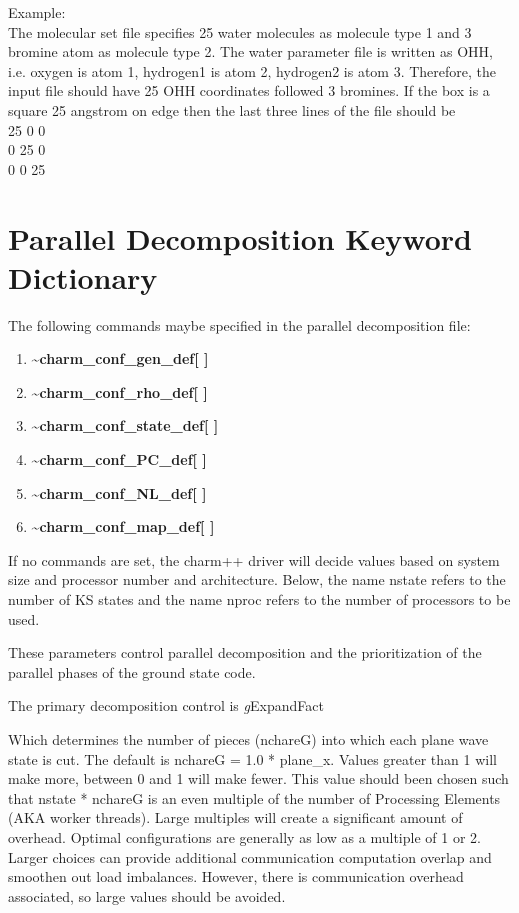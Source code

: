 \documentclass[12pt,titlepage]{article}
\begin{document}
Example: \\ 
The molecular set file specifies 25 water molecules as molecule
type 1 and 3 bromine atom as molecule type 2. The water parameter file is 
written as OHH, i.e. oxygen is atom 1, hydrogen1 is atom 2, hydrogen2 is 
atom 3. Therefore, the input file should have 25 OHH coordinates followed
3 bromines. If the box is a square 25 angstrom on edge 
then the last three lines of the file should be \\
\hspace*{1.5in}  25  0  0  \\
\hspace*{1.5in}  0  25  0  \\
\hspace*{1.5in}  0  0   25 \\

\newpage
\section{\bf Parallel Decomposition Keyword Dictionary} 

The following commands maybe specified in the parallel decomposition file:
\begin{enumerate}
\item {\bf \~{ }charm\_conf\_gen\_def[ ]}
\item {\bf \~{ }charm\_conf\_rho\_def[ ]}
\item {\bf \~{ }charm\_conf\_state\_def[ ]}
\item {\bf \~{ }charm\_conf\_PC\_def[ ]}
\item {\bf \~{ }charm\_conf\_NL\_def[ ]}
\item {\bf \~{ }charm\_conf\_map\_def[ ]}
\end{enumerate}
If no commands are set, the charm++ driver will decide values based
on system size and processor number and architecture. Below, the 
name nstate refers to the number of KS states and the name nproc
refers to the number of processors to be used.

These parameters control parallel decomposition and the prioritization
of the parallel phases of the ground state code.

The primary decomposition control is  {\emph gExpandFact}    

Which determines the number of pieces (nchareG) into which each plane
wave state is cut.  The default is nchareG = 1.0 * plane\_x.  Values greater
than 1 will make more, between 0 and 1 will make fewer.  This value
should been chosen such that nstate * nchareG is an even
multiple of the number of Processing Elements (AKA worker
threads). Large multiples will create a significant amount of
overhead.  Optimal configurations are generally as low as a multiple
of 1 or 2.  Larger choices can provide additional communication computation overlap and smoothen out load imbalances.  However, there is communication overhead associated, so large values should be avoided.
\end{document}
